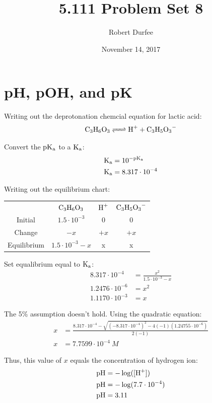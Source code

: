 \documentclass{article}
\title{ 5.111 Problem Set 8 }
\author{ Robert Durfee }
\date{ November 14, 2017 }
\begin{document}
\maketitle

\section{ pH, pOH, and pK }

Writing out the deprotonation chemcial equation for lactic acid:
$$\ce{C_3H_6O_3 <=> H+ + C_3H_5O_3-}$$

Convert the $\rm{pK_a}$ to a $\rm{K_a}$:
\begin{align*}
    \rm{K_a} &= 10^{-\rm{pK_a}} \\
    \rm{K_a} &= 8.317 \cdot 10^{-4}
\end{align*}

Writing out the equilibrium chart:

\begin{center}
    \begin{tabular}{c c c c}
         & $\ce{C_3H_6O_3}$ & $\ce{H+}$ & $\ce{C_3H_5O_3-}$ \\
        Initial & $1.5 \cdot 10^{-3}$ & 0 & 0 \\
        Change & $-x$ & $+x$ & $+x$ \\
        Equilibrium & $1.5 \cdot 10^{-3} - x$ & x & x
    \end{tabular}
\end{center}

Set equalibrium equal to $\rm{K_a}$:
\begin{align*}
    8.317 \cdot 10^{-4} &= \frac{x^2}{1.5 \cdot 10^{-3} - x} \\
    1.2476 \cdot 10^{-6} &= x^2 \\
    1.1170 \cdot 10^{-3} &= x
\end{align*}

The 5\% assumption doesn't hold. Using the quadratic equation:
\begin{align*}
    x &= \frac{8.317 \cdot 10^{-4} - \sqrt{ (-8.317 \cdot 10^{-4} )^2 -
    4(-1)(1.24755 \cdot 10^{-6})}}{2(-1)} \\
    x &= 7.7599 \cdot 10^{-4}\ \si{M}
\end{align*}

Thus, this value of $x$ equals the concentration of hydrogen ion:
\begin{align*}
    \rm{pH} &= -\log([\ce{H+}]) \\
    \rm{pH} &= -\log(7.7 \cdot 10^{-4}) \\
    \rm{pH} &= 3.11
\end{align*}
\end{document}
